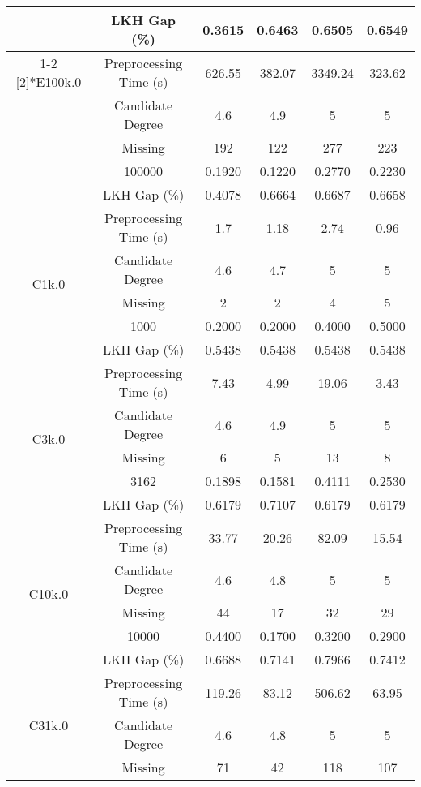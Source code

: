 \begin{table}[htbp]
\begin{tabular}{cccccc}
            & LKH Gap (\%) & 0.3615 & 0.6463 & 0.6505 & 0.6549 \\
  \cmidrule{1-2}    \multirow{5}[2]{*}{E100k.0} & Preprocessing Time (s) & 626.55 & 382.07 & 3349.24 & 323.62 \\
            & Candidate Degree & 4.6   & 4.9   & 5     & 5 \\
            & Missing & 192   & 122   & 277   & 223 \\
            & 100000 & 0.1920  & 0.1220  & 0.2770  & 0.2230  \\
            & LKH Gap (\%) & 0.4078 & 0.6664 & 0.6687 & 0.6658 \\
      \midrule
      \multirow{5}[2]{*}{C1k.0} & Preprocessing Time (s) & 1.7   & 1.18  & 2.74  & 0.96 \\
            & Candidate Degree & 4.6   & 4.7   & 5     & 5 \\
            & Missing & 2     & 2     & 4     & 5 \\
            & 1000  & 0.2000  & 0.2000  & 0.4000  & 0.5000  \\
            & LKH Gap (\%) & 0.5438 & 0.5438 & 0.5438 & 0.5438 \\
      \midrule
      \multirow{5}[2]{*}{C3k.0} & Preprocessing Time (s) & 7.43  & 4.99  & 19.06 & 3.43 \\
            & Candidate Degree & 4.6   & 4.9   & 5     & 5 \\
            & Missing & 6     & 5     & 13    & 8 \\
            & 3162  & 0.1898  & 0.1581  & 0.4111  & 0.2530  \\
            & LKH Gap (\%) & 0.6179 & 0.7107 & 0.6179 & 0.6179 \\
      \midrule
      \multirow{5}[2]{*}{C10k.0} & Preprocessing Time (s) & 33.77 & 20.26 & 82.09 & 15.54 \\
            & Candidate Degree & 4.6   & 4.8   & 5     & 5 \\
            & Missing & 44    & 17    & 32    & 29 \\
            & 10000 & 0.4400  & 0.1700  & 0.3200  & 0.2900  \\
            & LKH Gap (\%) & 0.6688 & 0.7141 & 0.7966 & 0.7412 \\
      \midrule
      \multirow{5}[2]{*}{C31k.0} & Preprocessing Time (s) & 119.26 & 83.12 & 506.62 & 63.95 \\
            & Candidate Degree & 4.6   & 4.8   & 5     & 5 \\
            & Missing & 71    & 42    & 118   & 107 \\

\end{tabular}
\end{table}
